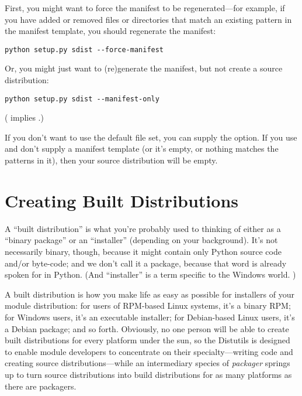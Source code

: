 \documentclass{howto}
\begin{document}
First, you might want to force the manifest to be regenerated---for
example, if you have added or removed files or directories that match an
existing pattern in the manifest template, you should regenerate the
manifest:
\begin{verbatim}
python setup.py sdist --force-manifest
\end{verbatim}

Or, you might just want to (re)generate the manifest, but not create a
source distribution:
\begin{verbatim}
python setup.py sdist --manifest-only
\end{verbatim}
( implies .)

If you don't want to use the default file set, you can supply the
 option.  If you use  and
don't supply a manifest template (or it's empty, or nothing matches the
patterns in it), then your source distribution will be empty.


\section{Creating Built Distributions}
\label{sec:built-dist}

A ``built distribution'' is what you're probably used to thinking of
either as a ``binary package'' or an ``installer'' (depending on your
background).  It's not necessarily binary, though, because it might
contain only Python source code and/or byte-code; and we don't call it a
package, because that word is already spoken for in Python.  (And
``installer'' is a term specific to the Windows world.  )

A built distribution is how you make life as easy as possible for
installers of your module distribution: for users of RPM-based Linux
systems, it's a binary RPM; for Windows users, it's an executable
installer; for Debian-based Linux users, it's a Debian package; and so
forth.  Obviously, no one person will be able to create built
distributions for every platform under the sun, so the Distutils is
designed to enable module developers to concentrate on their
specialty---writing code and creating source distributions---while an
intermediary species of \emph{packager} springs up to turn source
distributions into build distributions for as many platforms as there
are packagers.
\end{document}
